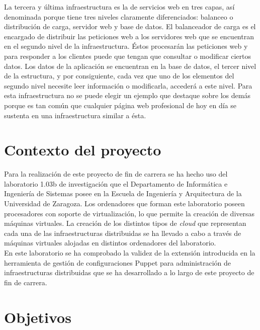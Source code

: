 La tercera y última infraestructura es la de servicios web en tres capas, así denominada porque tiene tres niveles claramente diferenciados: balanceo o distribución de carga, servidor web y base de datos. El balanceador de carga es el encargado de distribuir las peticiones web a los servidores web que se encuentran en el segundo nivel de la infraestructura. Éstos procesarán las peticiones web y para responder a los clientes puede que tengan que consultar o modificar ciertos datos. Los datos de la aplicación se encuentran en la base de datos, el tercer nivel de la estructura, y por consiguiente, cada vez que uno de los elementos del segundo nivel necesite leer información o modificarla, accederá a este nivel. Para esta infraestructura no se puede elegir un ejemplo que destaque sobre los demás porque es tan común que cualquier página web profesional de hoy en día se sustenta en una infraestructura similar a ésta.\\


\section{Contexto del proyecto}

Para la realización de este proyecto de fin de carrera se ha hecho uso del laboratorio 1.03b de investigación que el Departamento de Informática e Ingeniería de Sistemas posee en la Escuela de Ingeniería y Arquitectura de la Universidad de Zaragoza. Los ordenadores que forman este laboratorio poseen procesadores con soporte de virtualización, lo que permite la creación de diversas máquinas virtuales. La creación de los distintos tipos de \emph{cloud} que representan cada una de las infraestructuras distribuidas se ha llevado a cabo a través de máquinas virtuales alojadas en distintos ordenadores del laboratorio.\\

En este laboratorio se ha comprobado la validez de la extensión introducida en la herramienta de gestión de configuraciones Puppet para administración de infraestructuras distribuidas que se ha desarrollado a lo largo de este proyecto de fin de carrera.


\section{Objetivos}

